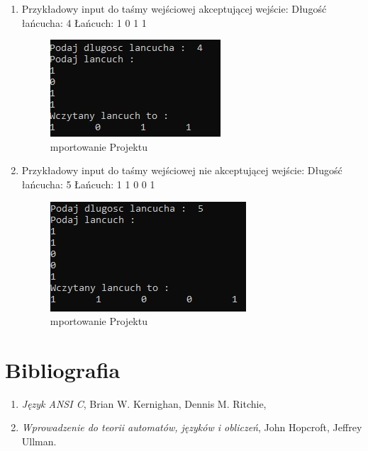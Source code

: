 \documentclass[10pt, a4paper]{report}
\begin{document}
    \begin{enumerate}
        \item Przykładowy input do taśmy wejściowej akceptującej wejście:
        \newline Długość łańcucha: 4
        \newline Łańcuch: 1 0 1 1

        \begin{figure}[h]
            \begin{center}
                \includegraphics[scale=1]{photo5.jpg}
                \caption{mportowanie Projektu}
            \end{center}
        \end{figure}
        
        \item Przykładowy input do taśmy wejściowej nie akceptującej wejście:
        \newline Długość łańcucha: 5
        \newline Łańcuch: 1 1 0 0 1

        \begin{figure}[h]
            \begin{center}
                \includegraphics[scale=1]{photo6.jpg}
                \caption{mportowanie Projektu}
            \end{center}
        \end{figure}
        
    \end{enumerate}

    \section{Bibliografia}
    \begin{enumerate}
        \item \textit{Język ANSI C}, Brian W. Kernighan, Dennis M. Ritchie,
        \item \textit{Wprowadzenie do teorii automatów, języków i obliczeń}, John Hopcroft, Jeffrey Ullman.
    \end{enumerate}
\end{document}
